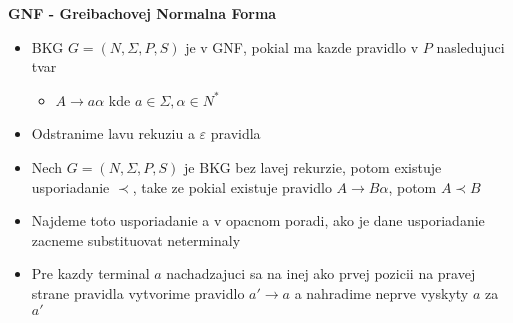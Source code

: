 \documentclass[12pt]{article}
\begin{document}
\textbf{GNF - Greibachovej Normalna Forma}
\begin{itemize}
	\item BKG $G = (N, \Sigma, P, S)$ je v GNF, pokial ma kazde pravidlo v $P$ nasledujuci tvar
	\begin{itemize}
		\item $A \to a\alpha$ kde $a \in \Sigma, \alpha \in N^{*}$
	\end{itemize}
	\item Odstranime lavu rekuziu a $\varepsilon$ pravidla
	\item Nech $G = (N, \Sigma, P, S)$ je BKG bez lavej rekurzie, potom existuje usporiadanie $\prec$, take ze
		pokial existuje pravidlo $A \to B\alpha$, potom $A \prec B$
	\item Najdeme toto usporiadanie a v opacnom poradi, ako je dane usporiadanie zacneme substituovat neterminaly
	\item Pre kazdy terminal $a$ nachadzajuci sa na inej ako prvej pozicii na pravej strane pravidla vytvorime pravidlo
		$a' \to a$ a nahradime neprve vyskyty $a$ za $a'$
\end{itemize}
\end{document}
